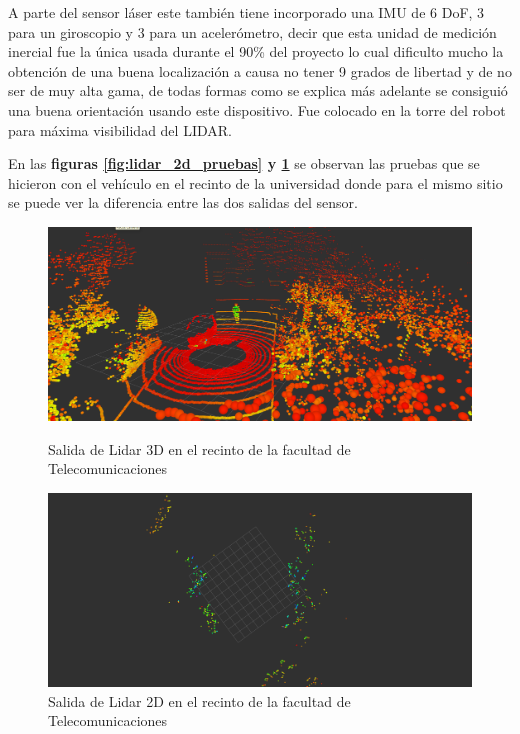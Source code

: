 A parte del sensor láser este también tiene incorporado una IMU de 6 DoF, 3 para un giroscopio y 3 para un acelerómetro, 
decir que esta unidad de medición inercial fue la única usada durante el 90\% del proyecto lo cual dificulto mucho la obtención de una 
buena localización a causa no tener 9 grados de libertad y de no ser de muy alta gama, de todas formas como se explica más adelante se 
consiguió una buena orientación usando este dispositivo. Fue colocado en la torre del robot para máxima visibilidad del LIDAR.

En las \textbf{figuras \ref{fig:lidar_2d_pruebas} y \ref{fig:lidar_3d_pruebas}} se observan las pruebas que se hicieron con el vehículo en el recinto 
de la universidad donde para el mismo sitio se puede ver la diferencia entre las dos salidas del sensor.



\begin{figure}[htbp]
  \centering
  \begin{minipage}[b]{0.45\textwidth}
    \centering
    \includegraphics[width=\textwidth]{images/lidar3d_2.png}
    \caption{Salida de Lidar 3D en el recinto de la facultad de Telecomunicaciones}
    \label{fig:lidar_2d_pruebas}
  \end{minipage}
  \hfill
  \begin{minipage}[b]{0.45\textwidth}
    \centering
    \includegraphics[width=\textwidth]{images/lidar2d.png}
    \caption{Salida de Lidar 2D en el recinto de la facultad de Telecomunicaciones}
    \label{fig:lidar_3d_pruebas}
  \end{minipage}
\end{figure}
\newpage

